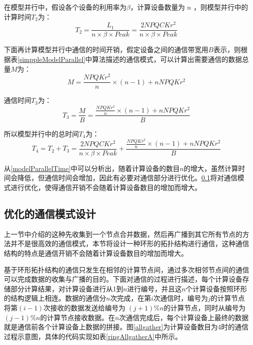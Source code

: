 在模型并行中，假设各个设备的利用率为$\beta$，计算设备数量为 $n$ ，则模型并行中的计算时间$T_2$为：
\begin{equation}
T_2 = \frac{L_1}{n \times \beta \times Peak} = \frac{2NPQCKr^2}{n\times \beta \times Peak}
\end{equation}

下面再计算模型并行中通信的时间开销，假定设备之间的通信带宽用$B$表示，则根据表\ref{simppleModelParallel}中算法描述的通信模式，可以计算出需要通信的数据总量$M$为：
\begin{equation}
M = \frac{NPQKr^2}{n}\times (n-1)+nNPQKr^2
\end{equation}

通信时间$T_3$为：
\begin{equation}
T_3 = \frac{M}{B} = \frac{\frac{NPQKr^2}{n}\times (n-1)+nNPQKr^2}{B}
\end{equation}

所以模型并行中的总时间$T_4$为：
\begin{equation}
\label{modelParallelTime}
T_4 = T_2 + T_3 = \frac{2NPQCKr^2}{n\times \beta \times Peak}+ \frac{\frac{NPQKr^2}{n}\times (n-1)+nNPQKr^2}{B}
\end{equation}

从\ref{modelParallelTime}中可以分析出，随着计算设备的数目$n$的增大，虽然计算时间会降低，但通信时间会增加，因此有必要对通信部分进行优化。\ref{commMode}将对通信模式进行优化，使得通信开销不会随着计算设备数目的增加而增大。

\subsection{优化的通信模式设计}
\label{commMode}
上一节中介绍的这种先收集到一个节点合并数据，然后再广播到其它所有节点的方法并不是很高效的通信模式，本节将设计一种环形的拓扑结构进行通信，这种通信结构的特点是通信开销不会随着计算设备数目的增加而增大。

基于环形拓扑结构的通信只发生在相邻的计算节点间，通过多次相邻节点间的通信可以完成数据的收集与广播的目的。下面对通信的过程进行描述，每个计算设备存储部分计算结果，对计算设备进行从1到$n$进行编号，并且这$n$个计算设备按照环形的结构逻辑上相连。数据的通信分$n$次完成，在第$i$次通信时，编号为$j$的计算节点将第$(i-1)$次接收的数据发送给编号为 $(j+1)\%n$的计算节点，同时从编号为$(j-1)\%n$的计算节点接收数据。在$n$次通信完成后，每个计算设备上最终的数据就是通信前各个计算设备上数据的拼接。图\ref{allgather}为计算设备数目为4时的通信过程示意图，具体的代码实现如表\ref{ringAllgatherA}中所示。

